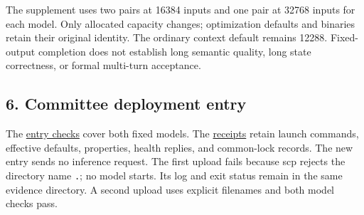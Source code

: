 \documentclass[10pt,a4paper]{article}
\begin{document}
The supplement uses two pairs at 16384 inputs and one pair at 32768
inputs for each model. Only allocated capacity changes; optimization
defaults and binaries retain their original identity. The ordinary
context default remains 12288. Fixed-output completion does not
establish long semantic quality, long state correctness, or formal
multi-turn acceptance.

\hypertarget{committee-deployment-entry}{%
\subsection{6. Committee deployment
entry}\label{committee-deployment-entry}}

The
\href{https://github.com/MoyaMryia/riscv-accl/blob/main/spacemit/reports/raw/k1-committee-entry-20261016-r1/smoke-summary.json}{entry
checks} cover both fixed models. The
\href{https://github.com/MoyaMryia/riscv-accl/blob/main/spacemit/reports/raw/k1-committee-entry-20261016-r1/receipts.json}{receipts}
retain launch commands, effective defaults, properties, health replies,
and common-lock records. The new entry sends no inference request. The
first upload fails because scp rejects the directory name \nolinkurl{.};
no model starts. Its log and exit status remain in the same evidence
directory. A second upload uses explicit filenames and both model checks
pass.
\end{document}
